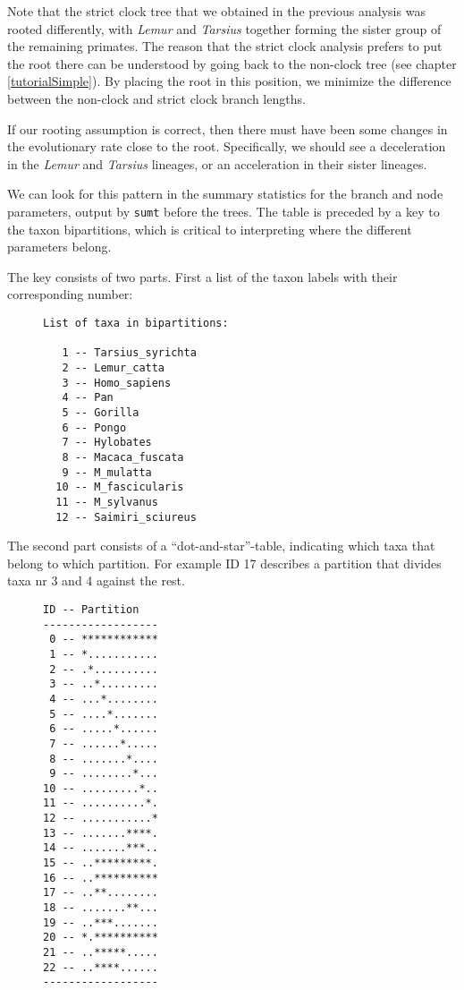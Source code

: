 \documentclass[12pt]{book}
\begin{document}
Note that the strict clock tree that we obtained in the previous analysis was rooted differently,
with \textit{Lemur} and \textit{Tarsius} together forming the sister group of the remaining
primates. The reason that the strict clock analysis prefers to put the root there can be
understood by going back to the non-clock tree (see chapter \ref{tutorialSimple}). By placing
the root in this position, we minimize the difference between the non-clock and strict clock
branch lengths.

If our rooting assumption is correct, then there must have been some changes in the evolutionary
rate close to the root. Specifically, we should see a deceleration in the \textit{Lemur} and
\textit{Tarsius} lineages, or an acceleration in their sister lineages.

We can look for this pattern in the summary statistics for the branch and node parameters, output
by \texttt{sumt} before the trees. The table is preceded by a key to the taxon bipartitions,
which is critical to interpreting where the different parameters belong.

The key consists of two parts. First a list of the taxon labels with their corresponding number:

\begin{figure}[h]
\centering
\begin{BVerbatim}
List of taxa in bipartitions:                                                 
                                                                                
   1 -- Tarsius_syrichta
   2 -- Lemur_catta
   3 -- Homo_sapiens
   4 -- Pan
   5 -- Gorilla
   6 -- Pongo
   7 -- Hylobates
   8 -- Macaca_fuscata
   9 -- M_mulatta
  10 -- M_fascicularis
  11 -- M_sylvanus
  12 -- Saimiri_sciureus
\end{BVerbatim}
\end{figure}

The second part consists of a ``dot-and-star''-table, indicating which taxa that belong to which
partition. For example ID 17 describes a partition that divides taxa nr 3 and 4 against the rest.
\begin{figure}[H]
\centering
\begin{BVerbatim}
ID -- Partition
------------------
 0 -- ************
 1 -- *...........
 2 -- .*..........
 3 -- ..*.........
 4 -- ...*........
 5 -- ....*.......
 6 -- .....*......
 7 -- ......*.....
 8 -- .......*....
 9 -- ........*...
10 -- .........*..
11 -- ..........*.
12 -- ...........*
13 -- .......****.
14 -- .......***..
15 -- ..*********.
16 -- ..**********
17 -- ..**........
18 -- .......**...
19 -- ..***.......
20 -- *.**********
21 -- ..*****.....
22 -- ..****......
------------------
\end{BVerbatim}
\end{figure}
\end{document}
